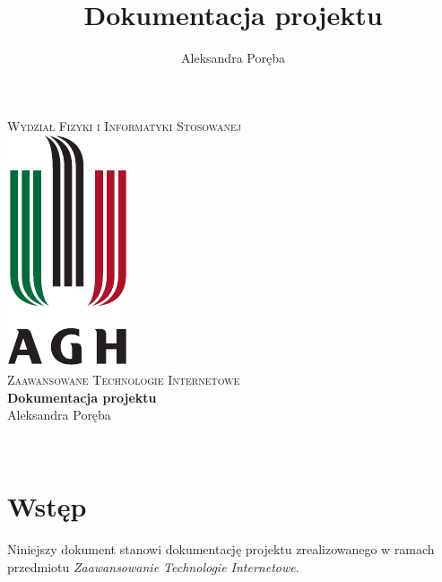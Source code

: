 \documentclass[12pt]{article}
\title{Dokumentacja projektu}
\author{Aleksandra Poręba}
\makeatletter
\let\thetitle\@title
\let\theauthor\@author
\makeatother
\begin{document}
\begin{center}
\textsc{\normalsize Wydział Fizyki i Informatyki Stosowanej}\\[2.0cm] 
\includegraphics[scale = 1]{logo.pdf}\\[1cm] 
\textsc{\Large Zaawansowane Technologie Internetowe}\\[0.4cm] 


{ \huge \bfseries \LARGE{Dokumentacja projektu} }\\[0.2cm] 

\flushright \Large Aleksandra Poręba

\vfill 

\center {\today}\\[2cm] 


\pagebreak 

\end{center}

\setcounter{tocdepth}{2}
\tableofcontents
\pagebreak


\pagestyle{fancy}
\fancyhf{}

\rhead{\theauthor}
\lhead{\thetitle}
\cfoot{\thepage}

\section{Wstęp}
Niniejszy dokument stanowi dokumentację projektu zrealizowanego w ramach przedmiotu \textit{Zaawansowanie Technologie Internetowe}. 
\end{document}
